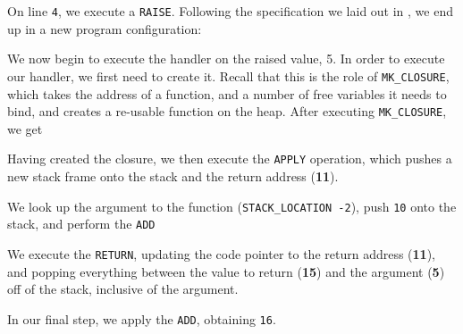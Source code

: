 \begin{center}
\end{center}

On line \texttt{4}, we execute a \texttt{RAISE}. Following the specification we laid out in , we end up in a new program configuration:

\begin{center}
\end{center}

We now begin to execute the handler on the raised value, 5. In order to execute our handler, we first need to create it. Recall that this is the role of \texttt{MK\_CLOSURE}, which takes the address of a function, and a number of free variables it needs to bind, and creates a re-usable function on the heap. After executing \texttt{MK\_CLOSURE}, we get
\begin{center}
\end{center}

Having created the closure, we then execute the \texttt{APPLY} operation, which pushes a new stack frame onto the stack and the return address (\textbf{11}).  

\begin{center}
\end{center}

We look up the argument to the function (\texttt{STACK\_LOCATION -2}), push \texttt{10} onto the stack, and perform the \texttt{ADD}

\begin{center}
\end{center}

We execute the \texttt{RETURN}, updating the code pointer to the return address (\textbf{11}), and popping everything between the value to return (\textbf{15}) and the argument (\textbf{5}) off of the stack, inclusive of the argument.

\begin{center}
\end{center}

In our final step, we apply the \texttt{ADD}, obtaining \texttt{16}.

